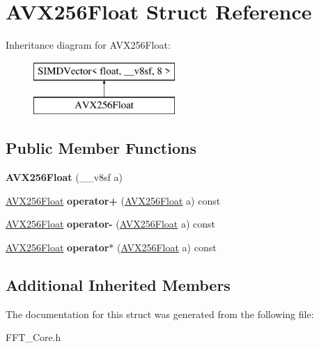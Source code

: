 \hypertarget{struct_a_v_x256_float}{}\section{A\+V\+X256\+Float Struct Reference}
\label{struct_a_v_x256_float}
Inheritance diagram for A\+V\+X256\+Float\+:\begin{figure}[H]
\begin{center}
\leavevmode
\includegraphics[height=2.000000cm]{struct_a_v_x256_float}
\end{center}
\end{figure}
\subsection*{Public Member Functions}
\begin{DoxyCompactItemize}
\item 
\mbox{\label{struct_a_v_x256_float_afaa8162220f55fda190efc80343f6a58}} 
{\bfseries A\+V\+X256\+Float} (\+\_\+\+\_\+v8sf a)
\item 
\mbox{\label{struct_a_v_x256_float_a2c214cad3b3bf68feeaded9e1a21d7b0}} 
\hyperlink{struct_a_v_x256_float}{A\+V\+X256\+Float} {\bfseries operator+} (\hyperlink{struct_a_v_x256_float}{A\+V\+X256\+Float} a) const
\item 
\mbox{\label{struct_a_v_x256_float_a00ad28569ec37183d5c078bf012f6c82}} 
\hyperlink{struct_a_v_x256_float}{A\+V\+X256\+Float} {\bfseries operator-\/} (\hyperlink{struct_a_v_x256_float}{A\+V\+X256\+Float} a) const
\item 
\mbox{\label{struct_a_v_x256_float_ab2c516e48c2df7b3ef4135f36f1728c9}} 
\hyperlink{struct_a_v_x256_float}{A\+V\+X256\+Float} {\bfseries operator$\ast$} (\hyperlink{struct_a_v_x256_float}{A\+V\+X256\+Float} a) const
\end{DoxyCompactItemize}
\subsection*{Additional Inherited Members}


The documentation for this struct was generated from the following file\+:\begin{DoxyCompactItemize}
\item 
F\+F\+T\+\_\+\+Core.\+h\end{DoxyCompactItemize}
